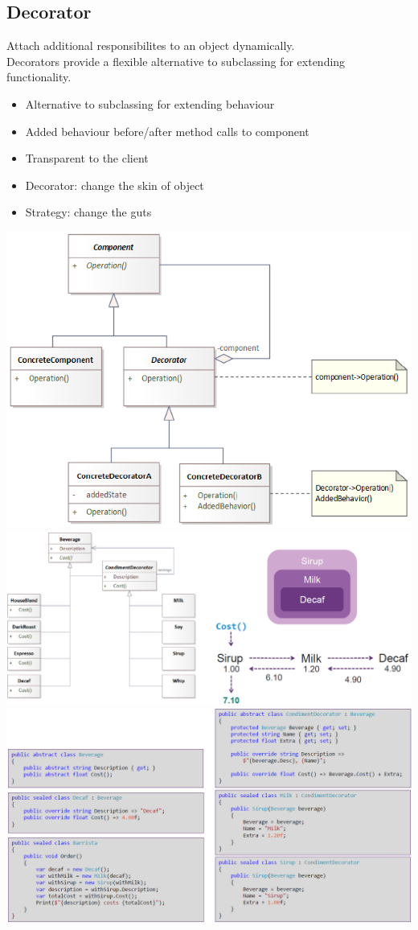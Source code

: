 \subsection{Decorator}
Attach additional responsibilites to an object dynamically.\\
Decorators provide a flexible alternative to subclassing for extending functionality.\\
\begin{itemize}
    \item Alternative to subclassing for extending behaviour
    \item Added behaviour before/after method calls to component
    \item Transparent to the client
    \item Decorator: change the skin of object
    \item Strategy: change the guts
\end{itemize}
\includegraphics[width=0.8\linewidth]{../img/decorator_pattern.png}\\
\includegraphics[width=\linewidth]{../img/decorator_pattern_2.png}\\
\includegraphics[width=\linewidth]{../img/decorator_pattern_code.png}\\

